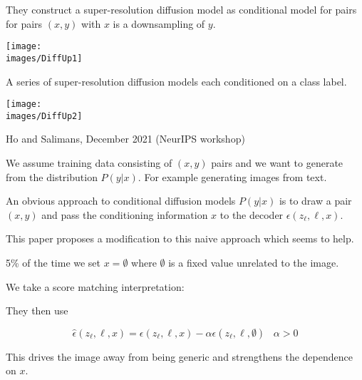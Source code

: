 {

They construct a super-resolution diffusion model as conditional model for pairs for pairs $(x,y)$ with $x$ is a downsampling of $y$.

\vfill
\centerline{\texttt{[image: \\images/DiffUp1]}}


A series of super-resolution diffusion models each conditioned on a class label.

\centerline{\texttt{[image: \\images/DiffUp2]}}


{Ho and Salimans, December 2021 (NeurIPS workshop)}

We assume training data consisting of $(x,y)$ pairs and we want to generate from the distribution $P(y|x)$.  For example generating images from text.

\vfill
An obvious approach to conditional diffusion models $P(y|x)$ is to draw a pair $(x,y)$ and pass the conditioning information $x$ to the decoder
$\epsilon(z_\ell,\ell,x)$.

\vfill
This paper proposes a modification to this naive approach which seems to help.


5\% of the time we set $x = \emptyset$ where $\emptyset$ is a fixed value unrelated to the image.

\vfill
We take a score matching interpretation:

They then use

$$\hat{\epsilon}(z_\ell,\ell,x) = \epsilon(z_\ell,\ell,x) - \alpha\epsilon(z_\ell,\ell,\emptyset)\;\;\;\alpha>0$$

\vfill
This drives the image away from being generic and strengthens the dependence on $x$.

}

